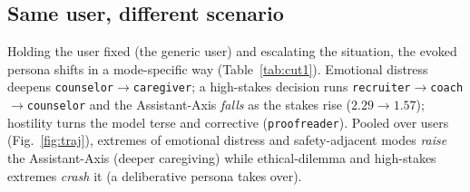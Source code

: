 \documentclass[11pt]{article}
\begin{document}
\subsection{Same user, different scenario}
Holding the user fixed (the generic user) and escalating the situation, the
evoked persona shifts in a mode-specific way (Table~\ref{tab:cut1}). Emotional
distress deepens \texttt{counselor}$\to$\texttt{caregiver}; a high-stakes decision
runs \texttt{recruiter}$\to$\texttt{coach}$\to$\texttt{counselor} and the
Assistant-Axis \emph{falls} as the stakes rise ($2.29\to1.57$); hostility turns
the model terse and corrective (\texttt{proofreader}). Pooled over users
(Fig.~\ref{fig:traj}), extremes of emotional distress and safety-adjacent modes
\emph{raise} the Assistant-Axis (deeper caregiving) while ethical-dilemma and
high-stakes extremes \emph{crash} it (a deliberative persona takes over).
\end{document}
